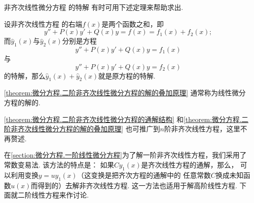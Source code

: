 非齐次线性微分方程  的特解
有时可用下述定理来帮助求出.
\begin{theorem}\label{theorem:微分方程.二阶非齐次线性微分方程的解的叠加原理}
设非齐次线性方程 
的右端\(f(x)\)是两个函数之和，即\[
	y''+P(x)y'+Q(x)y
	=f(x)
	=f_1(x)+f_2(x);
\]而\(\hat{y}_1(x)\)与\(\hat{y}_2(x)\)分别是方程\[
	y''+P(x)y'+Q(x)y=f_1(x)
\]与\[
	y''+P(x)y'+Q(x)y=f_2(x)
\]的特解，那么\(\hat{y}_1(x)+\hat{y}_2(x)\)就是原方程的特解.
\end{theorem}

\cref{theorem:微分方程.二阶非齐次线性微分方程的解的叠加原理}
通常称为线性微分方程的解的.

\cref{theorem:微分方程.二阶非齐次线性微分方程的通解结构}
和\cref{theorem:微分方程.二阶非齐次线性微分方程的解的叠加原理}
也可推广到\(n\)阶非齐次线性方程，这里不再赘述.

在\cref{section:微分方程.一阶线性微分方程}为了解一阶非齐次线性方程，我们采用了常数变易法.
该方法的特点是：
如果\(C y_1(x)\)是齐次线性方程的通解，那么，
可以利用变换\(y = u y_1(x)\)（这变换是把齐次方程的通解中的
任意常数\(C\)换成未知函数\(u(x)\)而得到的）去解非齐次线性方程.
这一方法也适用于解高阶线性方程.
下面就二阶线性方程来作讨论.

